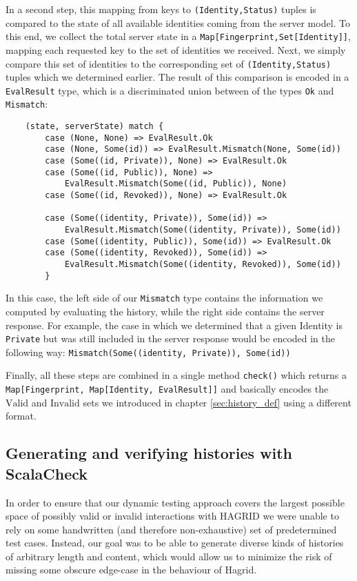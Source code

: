In a second step, this mapping from keys to \texttt{(Identity,Status)} tuples is compared to the state of all available identities coming from the server model.
To this end, we collect the total server state in a \texttt{Map[Fingerprint,Set[Identity]]}, mapping each requested key to the set of identities we received. 
Next, we simply compare this set of identities to the corresponding set of \texttt{(Identity,Status)} tuples which we determined earlier. The result of this comparison is encoded in a \texttt{EvalResult} type, which is a discriminated union between of the types \texttt{Ok} and \texttt{Mismatch}: 
\begin{code}
    \begin{verbatim}
    (state, serverState) match {
        case (None, None) => EvalResult.Ok
        case (None, Some(id)) => EvalResult.Mismatch(None, Some(id))
        case (Some((id, Private)), None) => EvalResult.Ok
        case (Some((id, Public)), None) =>
            EvalResult.Mismatch(Some((id, Public)), None)
        case (Some((id, Revoked)), None) => EvalResult.Ok

        case (Some((identity, Private)), Some(id)) =>
            EvalResult.Mismatch(Some((identity, Private)), Some(id))
        case (Some((identity, Public)), Some(id)) => EvalResult.Ok
        case (Some((identity, Revoked)), Some(id)) =>
            EvalResult.Mismatch(Some((identity, Revoked)), Some(id))
        }
    \end{verbatim}
    \caption{Comparison between a computed state and a server state}
\end{code}

In this case, the left side of our \texttt{Mismatch} type contains the information we computed by evaluating the history, while the right side contains the server response. For example, the case in which we determined that a given Identity is \texttt{Private} but was still included in the server response would be encoded in the following way: \texttt{Mismatch(Some((identity, Private)), Some(id))}

Finally, all these steps are combined in a single method \texttt{check()} which returns a \texttt{Map[Fingerprint, Map[Identity, EvalResult]]} and basically encodes the \(\text{Valid}\) and \(\text{Invalid}\) sets we introduced in chapter \ref{sec:history_def} using a different format. 


\subsection{Generating and verifying histories with ScalaCheck}
\label{sec:test_approach}
In order to ensure that our dynamic testing approach covers the largest possible space of possibly valid or invalid interactions with HAGRID we were unable to rely on some handwritten (and therefore non-exhaustive) set of predetermined test cases. Instead, our goal was to be able to generate diverse kinds of histories of arbitrary length and content, which would allow us to minimize the risk of missing some obscure edge-case in the behaviour of Hagrid.

